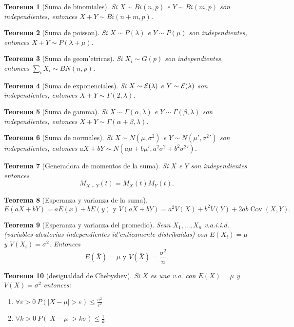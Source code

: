 \documentclass[a4paper,spanish]{article}
\newcommand{\eps}[0]{\varepsilon}
\DeclareMathOperator{\Cov}{Cov}
\newcommand{\expon}[0]{{\cal E}}
\newtheorem{teo}{Teorema}
\begin{document}
\begin{teo}[Suma de binomiales]
Si $X \sim Bi(n,p)$ e $Y \sim Bi(m,p)$ son independientes, entonces 
$X+Y \sim Bi(n+m,p)$.
\end{teo}

\begin{teo}[Suma de poisson]
Si $X \sim P(\lambda)$ e $Y \sim P(\mu)$ son independientes, entonces 
$X+Y \sim P(\lambda + \mu)$.
\end{teo}

\begin{teo}[Suma de geom'etricas]
Si $X_i \sim G(p)$ son independientes, entonces $\sum_i X_i \sim BN(n,p)$.
\end{teo}

\begin{teo}[Suma de exponenciales]
Si $X \sim \expon(\lambda)$ e $Y \sim \expon(\lambda)$ son independientes, 
entonces $X+Y \sim \Gamma(2, \lambda)$.
\end{teo}

\begin{teo}[Suma de gamma]
Si $X \sim \Gamma(\alpha, \lambda)$ e $Y \sim \Gamma(\beta, \lambda)$ son
independientes, entonces $X+Y \sim \Gamma(\alpha+\beta, \lambda)$.
\end{teo}

\begin{teo}[Suma de normales]
Si $X \sim N(\mu,\sigma^2)$ e $Y \sim N(\mu', {\sigma^2}')$ son independientes,
entonces $aX+bY \sim N(a\mu+b\mu', a^2\sigma^2+b^2{\sigma^2}')$.
\end{teo}

\begin{teo}[Generadora de momentos de la suma]
Si $X$ e $Y$ son independientes entonces $$M_{X+Y}(t) = M_X(t) M_Y(t).$$
\end{teo}

\begin{teo}[Esperanza y varianza de la suma]
$$E(aX+bY) = aE(x)+bE(y) \mbox{\ \ y\ \ } 
	V(aX+bY) = a^2V(X)+b^2V(Y)+2ab\Cov(X,Y).$$
\end{teo}

\begin{teo}[Esperanza y varianza del promedio]
Sean $X_1,...,X_n$ v.a.i.i.d. (variables aleatorias independientes 
id'enticamente distribuidas) con $E(X_i) = \mu$ y $V(X_i) = \sigma^2$. 
Entonces 
$$E(\bar{X}) = \mu \mbox{\ \ y\ \ } V(\bar{X}) = \frac{\sigma^2}{n}.$$
\end{teo}

\begin{teo}[desigualdad de Chebyshev]
Si $X$ es una v.a. con $E(X) = \mu$ y $V(X) = \sigma^2$ entonces:
\begin{enumerate}
\item $\forall \eps > 0\ P(|X - \mu| > \eps) \leq \frac{\sigma^2}{\eps^2}$
\item $\forall k > 0\ P(|X - \mu| > k\sigma) \leq \frac{1}{k}$
\end{enumerate}
\end{teo}
\end{document}
